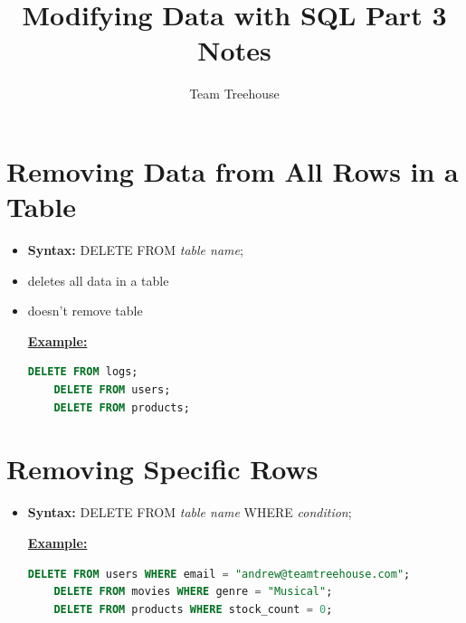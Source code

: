 \documentclass[12pt]{article}
\begin{document}
\title{Modifying Data with SQL Part 3 Notes}
\author{Team Treehouse}
\maketitle

\bigskip

\section{Removing Data from All Rows in a Table}

\bigskip

\begin{itemize}
    \item \textbf{Syntax:} DELETE FROM \textit{table name};
    \item deletes all data in a table
    \item doesn't remove table

    \bigskip

    \underline{\textbf{Example:}}

    \bigskip

    \begin{lstlisting}[language=SQL]
    DELETE FROM logs;
    DELETE FROM users;
    DELETE FROM products;
    \end{lstlisting}
\end{itemize}

\bigskip

\section{Removing Specific Rows}

\bigskip


\begin{itemize}
    \item \textbf{Syntax:} DELETE FROM \textit{table name} WHERE \textit{condition};

    \bigskip

    \underline{\textbf{Example:}}

    \bigskip

    \begin{lstlisting}[language=SQL]
    DELETE FROM users WHERE email = "andrew@teamtreehouse.com";
    DELETE FROM movies WHERE genre = "Musical";
    DELETE FROM products WHERE stock_count = 0;
    \end{lstlisting}

\end{itemize}
\end{document}
